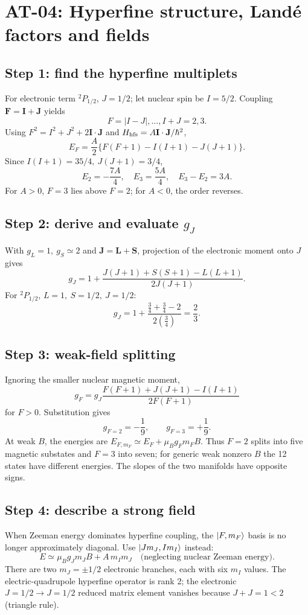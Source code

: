 
\section{AT-04: Hyperfine structure, Land\'e factors and fields}
\subsection*{Step 1: find the hyperfine multiplets}
For electronic term \({}^2P_{1/2}\), \(J=1/2\);
let nuclear spin be \(I=5/2\). Coupling
\(\mathbf F=\mathbf I+\mathbf J\) yields
\[
\boxed{F=|I-J|,\ldots,I+J=2,3}.
\]
Using \(F^2=I^2+J^2+2\mathbf I\cdot\mathbf J\)
and \(H_{\rm hfs}=A\mathbf I\cdot\mathbf J/\hbar^2\),
\[
\boxed{E_F=\frac A2\{F(F+1)-I(I+1)-J(J+1)\}}.
\]
Since \(I(I+1)=35/4,\ J(J+1)=3/4\),
\[
\boxed{E_2=-\frac{7A}{4},\quad
E_3=\frac{5A}{4},\quad E_3-E_2=3A}.
\]
For \(A>0\), \(F=3\) lies above \(F=2\); for
\(A<0\), the order reverses.

\subsection*{Step 2: derive and evaluate \(g_J\)}
With \(g_L=1,\ g_S\simeq2\) and \(\mathbf J=\mathbf L+\mathbf S\),
projection of the electronic moment onto \(J\) gives
\[
g_J=1+\frac{J(J+1)+S(S+1)-L(L+1)}{2J(J+1)}.
\]
For \({}^2P_{1/2}\), \(L=1,\ S=1/2,\ J=1/2\):
\[
\boxed{g_J=1+\frac{\frac34+\frac34-2}{2(\frac34)}
=\frac23}.
\]

\subsection*{Step 3: weak-field splitting}
Ignoring the smaller nuclear magnetic moment,
\[
g_F=g_J\frac{F(F+1)+J(J+1)-I(I+1)}{2F(F+1)}
\]
for \(F>0\). Substitution gives
\[
\boxed{g_{F=2}=-\frac19,\qquad g_{F=3}=+\frac19.}
\]
At weak \(B\), the energies are
\(E_{F,m_F}\simeq E_F+\mu_Bg_Fm_FB\).
Thus \(F=2\) splits into five magnetic substates
and \(F=3\) into seven; for generic weak nonzero
\(B\) the 12 states have different energies.
The slopes of the two manifolds have opposite signs.

\subsection*{Step 4: describe a strong field}
When Zeeman energy dominates hyperfine coupling,
the \(\left\lvert F,m_F\right\rangle\) basis is no longer approximately
diagonal. Use \(\left\lvert Jm_J,Im_I\right\rangle\) instead:
\[
E\simeq \mu_Bg_Jm_JB+A\,m_Im_J
\quad\text{(neglecting nuclear Zeeman energy)}.
\]
There are two \(m_J=\pm1/2\) electronic branches,
each with six \(m_I\) values.
The electric-quadrupole hyperfine operator is rank 2;
the electronic \(J=1/2\to J=1/2\) reduced matrix
element vanishes because \(J+J=1<2\) (triangle rule).
